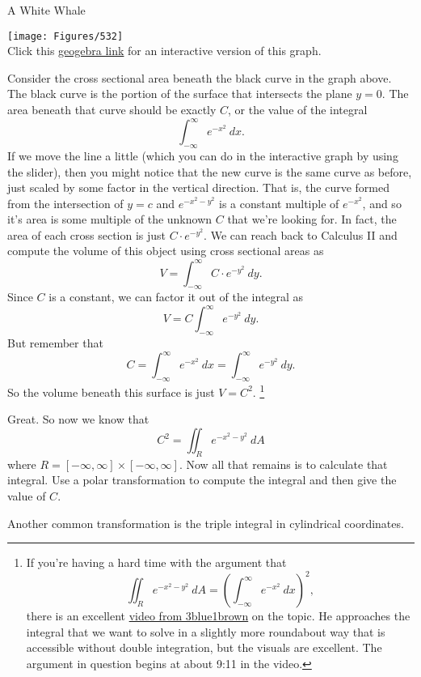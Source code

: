 \begin{exercise}{A White Whale}
\vspace{1em}
\begin{center}
\texttt{[image: Figures/532]}\\ Click this \href{https://www.geogebra.org/3d/yrkngady}{geogebra link} for an interactive version of this graph.
\end{center}
\vspace{1em}
Consider the cross sectional area beneath the black curve in the graph above. The black curve is the portion of the surface that intersects the plane $y=0$. The area beneath that curve should be exactly $C$, or the value of the integral $$\int_{-\infty}^{\infty}e^{-x^2}\ dx.$$
If we move the line a little (which you can do in the interactive graph by using the slider), then you might notice that the new curve is the same curve as before, just scaled by some factor in the vertical direction. That is, the curve formed from the intersection of $y=c$ and $e^{-x^2-y^2}$ is a constant multiple of $e^{-x^2}$, and so it's area is some multiple of the unknown $C$ that we're looking for. In fact, the area of each cross section is just $C\cdot e^{-y^2}.$ We can reach back to Calculus II and compute the volume of this object using cross sectional areas as $$V=\int_{-\infty}^{\infty}C\cdot e^{-y^2}\ dy. $$ Since $C$ is a constant, we can factor it out of the integral as $$V=C\int_{-\infty}^{\infty}e^{-y^2}\ dy .$$ But remember that $$C=\int_{-\infty}^{\infty}e^{-x^2}\ dx=\int_{-\infty}^{\infty}e^{-y^2}\ dy.$$ So the volume beneath this surface is just $V=C^2$. \footnote{If you're having a hard time with the argument that $$\iint_R e^{-x^2-y^2}\ dA=\left(\int_{-\infty}^{\infty}e^{-x^2}\ dx\right)^2, $$ there is an excellent \href{https://youtu.be/cy8r7WSuT1I?t=551}{video from 3blue1brown} on the topic. He approaches the integral that we want to solve in a slightly more roundabout way that is accessible without double integration, but the visuals are excellent. The argument in question begins at about 9:11 in the video.}

\vspace{1em}

Great. So now we know that $$C^2=\iint_R e^{-x^2-y^2}\ dA $$ where $R=[-\infty,\infty]\times[-\infty,\infty].$ Now all that remains is to calculate that integral. Use a polar transformation to compute the integral and then give the value of $C$.

\end{exercise}

\hypertarget{cylind}{Another common transformation is the triple integral in cylindrical coordinates.}

